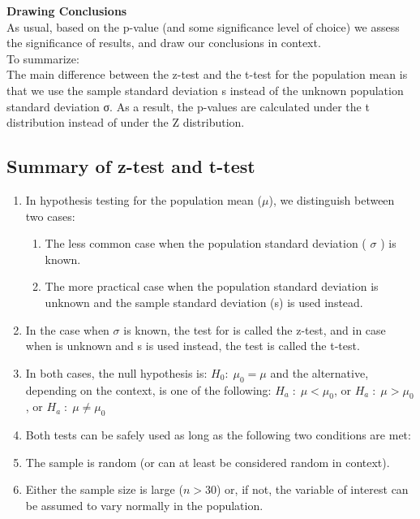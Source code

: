 \documentclass[10pt, a4paper]{article}
\begin{document}
\textbf{Drawing Conclusions}\\
As usual, based on the p-value (and some significance level of choice) we assess the significance of results, and draw our conclusions in context.\\
To summarize:\\
The main difference between the z-test and the t-test for the population mean is that we use the sample standard deviation s instead of the unknown population standard deviation σ. As a result, the p-values are calculated under the t distribution instead of under the Z distribution.
\subsection{Summary of z-test and t-test}
\begin{enumerate}
\item In hypothesis testing for the population mean ($\mu$), we distinguish between two cases:
\begin{enumerate}
\item The less common case when the population standard deviation (
$\sigma$
 ) is known.
 \item  The more practical case when the population standard deviation is unknown and the sample standard deviation (s) is used instead.
\end{enumerate}
\item In the case when $\sigma$
 is known, the test for is called the z-test, and in case when
 is unknown and s is used instead, the test is called the t-test.
 \item In both cases, the null hypothesis is:
$H_0: \; \mu_0=\mu$
 and the alternative, depending on the context, is one of the following:
 $H_a\;:\; \mu < \mu_0 $, or  $H_a\;:\; \mu > \mu_0 $, or $H_a\;:\; \mu \neq \mu_0 $
 \item  Both tests can be safely used as long as the following two conditions are met:
\item  The sample is random (or can at least be considered random in context).
\item  Either the sample size is large ($n > 30$) or, if not, the variable of interest can be assumed to vary normally in the population.
\end{enumerate}
\end{document}
